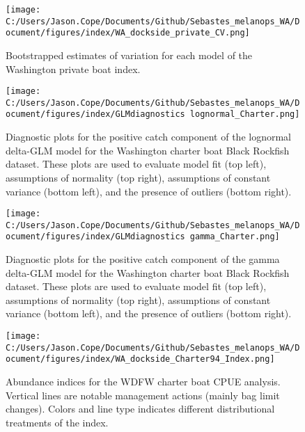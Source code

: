 \documentclass[11pt,
  english,
  letterpaper,
]{article}
\begin{document}
\pagebreak

\begin{figure}
\centering
\texttt{[image: C:/Users/Jason.Cope/Documents/Github/Sebastes\_melanops\_WA/Document/figures/index/WA\_dockside\_private\_CV.png]}
\caption{Bootstrapped estimates of variation for each model of the Washington private boat index.\label{fig:private-CVs}}
\end{figure}

\pagebreak

\begin{figure}
\centering
\texttt{[image: C:/Users/Jason.Cope/Documents/Github/Sebastes\_melanops\_WA/Document/figures/index/GLMdiagnostics lognormal\_Charter.png]}
\caption{Diagnostic plots for the positive catch component of the lognormal delta-GLM model for the Washington charter boat Black Rockfish dataset. These plots are used to evaluate model fit (top left), assumptions of normality (top right), assumptions of constant variance (bottom left), and the presence of outliers (bottom right).\label{fig:charter-log-diags}}
\end{figure}

\pagebreak

\begin{figure}
\centering
\texttt{[image: C:/Users/Jason.Cope/Documents/Github/Sebastes\_melanops\_WA/Document/figures/index/GLMdiagnostics gamma\_Charter.png]}
\caption{Diagnostic plots for the positive catch component of the gamma delta-GLM model for the Washington charter boat Black Rockfish dataset. These plots are used to evaluate model fit (top left), assumptions of normality (top right), assumptions of constant variance (bottom left), and the presence of outliers (bottom right).\label{fig:charter-gam-diags}}
\end{figure}

\pagebreak

\begin{figure}
\centering
\texttt{[image: C:/Users/Jason.Cope/Documents/Github/Sebastes\_melanops\_WA/Document/figures/index/WA\_dockside\_Charter94\_Index.png]}
\caption{Abundance indices for the WDFW charter boat CPUE analysis. Vertical lines are notable management actions (mainly bag limit changes). Colors and line type indicates different distributional treatments of the index.\label{fig:charter-index}}
\end{figure}
\end{document}
